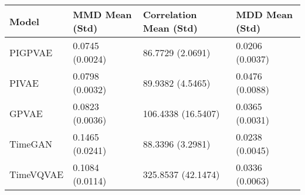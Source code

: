\begin{tabular}{llll}
\toprule
Model & MMD Mean (Std) & Correlation Mean (Std) & MDD Mean (Std) \\
\midrule
PIGPVAE & 0.0745 (0.0024) & 86.7729 (2.0691) & 0.0206 (0.0037) \\
PIVAE & 0.0798 (0.0032) & 89.9382 (4.5465) & 0.0476 (0.0088) \\
GPVAE & 0.0823 (0.0036) & 106.4338 (16.5407) & 0.0365 (0.0031) \\
TimeGAN & 0.1465 (0.0241) & 88.3396 (3.2981) & 0.0238 (0.0045) \\
TimeVQVAE & 0.1084 (0.0114) & 325.8537 (42.1474) & 0.0336 (0.0063) \\
\bottomrule
\end{tabular}

